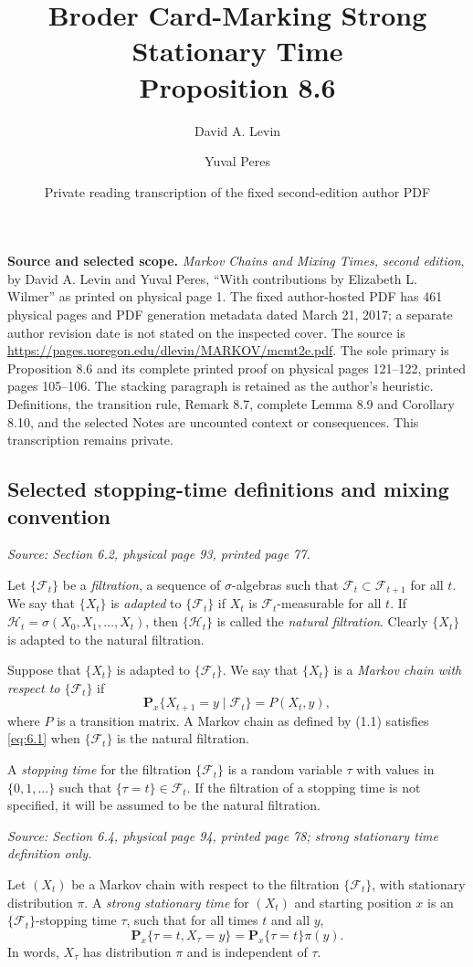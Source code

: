 \documentclass[11pt]{article}
\title{Broder Card-Marking Strong Stationary Time\\Proposition 8.6}
\author{David A. Levin \and Yuval Peres}
\date{Private reading transcription of the fixed second-edition author PDF}
\newcommand{\Ft}{\mathcal{F}_t}
\newcommand{\Px}{\mathbf{P}_x}
\newcommand{\sourceloc}[1]{\par\smallskip\noindent\textit{Source: #1.}\par\nopagebreak[4]\smallskip}
\begin{document}
\maketitle

\noindent\textbf{Source and selected scope.}
\emph{Markov Chains and Mixing Times, second edition}, by David A. Levin
and Yuval Peres, ``With contributions by Elizabeth L. Wilmer'' as printed
on physical page 1. The fixed author-hosted PDF has 461 physical pages
and PDF generation metadata dated March 21, 2017; a separate author
revision date is not stated on the inspected cover.
The source is \url{https://pages.uoregon.edu/dlevin/MARKOV/mcmt2e.pdf}.
The sole primary is Proposition 8.6 and its complete printed proof on
physical pages 121--122, printed pages 105--106. The stacking paragraph
is retained as the author's heuristic. Definitions, the transition
rule, Remark 8.7, complete Lemma 8.9 and Corollary 8.10, and the selected
Notes are uncounted context or consequences. This transcription remains
private.

\subsection*{Selected stopping-time definitions and mixing convention}
\sourceloc{Section 6.2, physical page 93, printed page 77}
Let $\{\Ft\}$ be a \emph{filtration}, a sequence of $\sigma$-algebras such
that $\Ft\subset\mathcal{F}_{t+1}$ for all $t$. We say that $\{X_t\}$ is
\emph{adapted} to $\{\Ft\}$ if $X_t$ is $\Ft$-measurable for all $t$.
If $\mathcal{H}_t=\sigma(X_0,X_1,\ldots,X_t)$, then
$\{\mathcal{H}_t\}$ is called the \emph{natural filtration}. Clearly
$\{X_t\}$ is adapted to the natural filtration.

Suppose that $\{X_t\}$ is adapted to $\{\Ft\}$. We say that $\{X_t\}$ is
a \emph{Markov chain with respect to $\{\Ft\}$} if
\begin{equation}
\Px\{X_{t+1}=y\mid\Ft\}=P(X_t,y),
\tag{6.1}\label{eq:6.1}
\end{equation}
where $P$ is a transition matrix. A Markov chain as defined by (1.1)
satisfies \eqref{eq:6.1} when $\{\Ft\}$ is the natural filtration.

A \emph{stopping time} for the filtration $\{\Ft\}$ is a random variable
$\tau$ with values in $\{0,1,\ldots\}$ such that $\{\tau=t\}\in\Ft$.
If the filtration of a stopping time is not specified, it will be assumed
to be the natural filtration.

\sourceloc{Section 6.4, physical page 94, printed page 78; strong stationary time definition only}
Let $(X_t)$ be a Markov chain with respect to the filtration $\{\Ft\}$,
with stationary distribution $\pi$. A \emph{strong stationary time} for
$(X_t)$ and starting position $x$ is an $\{\Ft\}$-stopping time $\tau$,
such that for all times $t$ and all $y$,
\begin{equation}
\Px\{\tau=t,X_\tau=y\}=\Px\{\tau=t\}\pi(y).
\tag{6.3}\label{eq:6.3}
\end{equation}
In words, $X_\tau$ has distribution $\pi$ and is independent of $\tau$.
\end{document}

